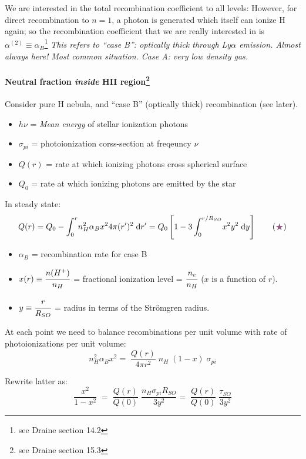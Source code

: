 \documentclass[11pt]{article}
\newcommand{\mar}[1]{\hspace{0pt}\marginpar{-\textcolor{black}{#1}-}}
\newcommand{\mynotes}[1]{{\fontfamily{cmss}\selectfont \textit{#1}}}
\begin{document}
We are interested in the total recombination coefficient to all levels:
However, for direct recombination
to $ n=1 $, a photon is generated which itself can ionize H again; so the
recombination coefficient that we are really interested in is
$\alpha^{(2)} \equiv \alpha_{B}$\footnote{see Draine section 14.2}
\mynotes{This refers to ``case B'': optically thick through Ly$\alpha$
emission. Almost always here! Most common situation. Case A: very low
density gas.}

\paragraph{Neutral fraction \emph{inside} HII region\footnote{see Draine
section 15.3}}
\mar{56}Consider pure H nebula, and ``case B'' (optically thick)
recombination (see later).
\begin{itemize}
    \item $h\nu$ = \emph{Mean energy} of stellar ionization photons
    \item $\sigma_{pi}$ = photoionization corss-section at freqeuncy $\nu$
    \item $Q(r)$ = rate at which ionizing photons cross spherical surface
    \item $Q_{0}$ = rate at which ionizing photons are emitted by the star
\end{itemize}
In steady state:
\[
    Q(r)
    = Q_{0} - \int_{0}^{r}{\!
        n_{H}^{2} \alpha_{B} x^{2} 4\pi(r')^{2} \;\mathrm{d}r'}
    = Q_{0} \left[ 1 - 3\int_{0}^{r/R_{SO}}{\!
        x^{2}y^{2} \;\mathrm{d}y} \right]
    \qquad (\textcolor{mypur}{\bigstar})
    \]
\begin{itemize}[itemsep=1ex]
    \item $\alpha_{B}$ = recombination rate for case B
    \item $x(r) \equiv \cfrac{n(H^{+})}{n_{H}}$ = fractional ionization level
        = $\cfrac{n_{e}}{n_{H}}$ ($x$ is a function of $r$).
    \item $y \equiv \cfrac{r}{R_{SO}}$ = radius in terms of the
        Str\"{o}mgren radius.
\end{itemize}
At each point we need to balance recombinations per unit volume with rate of
photoionizations per unit volume:
\[
    n_{H}^{2} \alpha_{B} x^{2}
    =\; \frac{Q(r)}{4{\pi}r^{2}}\; n_{H}\; (1-x)\; \sigma_{pi}
    \]

\mar{57}Rewrite latter as:
\[
    \frac{x^{2}}{1-x^{2}}\;
    =\; \frac{Q(r)}{Q(0)}\; \frac{n_{H} \sigma_{pi} R_{SO}}{3y^{2}}
    =\; \frac{Q(r)}{Q(0)}\; \frac{\tau_{SO}}{3y^{2}}
    \]
\end{document}
